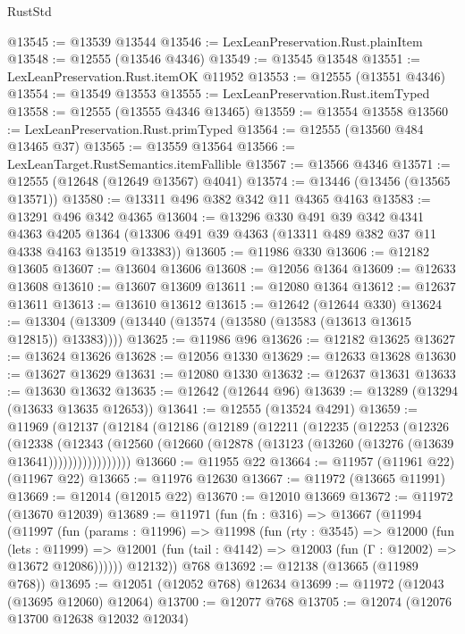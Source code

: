\begin{lexlean}{RustStd}
\begin{coremodule}
@13545 := @13539 @13544
@13546 := LexLeanPreservation.Rust.plainItem
@13548 := @12555 (@13546 @4346)
@13549 := @13545 @13548
@13551 := LexLeanPreservation.Rust.itemOK @11952
@13553 := @12555 (@13551 @4346)
@13554 := @13549 @13553
@13555 := LexLeanPreservation.Rust.itemTyped
@13558 := @12555 (@13555 @4346 @13465)
@13559 := @13554 @13558
@13560 := LexLeanPreservation.Rust.primTyped
@13564 := @12555 (@13560 @484 @13465 @37)
@13565 := @13559 @13564
@13566 := LexLeanTarget.RustSemantics.itemFallible
@13567 := @13566 @4346
@13571 := @12555 (@12648 (@12649 @13567) @4041)
@13574 := @13446 (@13456 (@13565 @13571))
@13580 := @13311 @496 @382 @342 @11 @4365 @4163
@13583 := @13291 @496 @342 @4365
@13604 := @13296
    @330
    @491
    @39
    @342
    @4341
    @4363
    @4205
    @1364
    (@13306 @491 @39 @4363 (@13311 @489 @382 @37 @11 @4338 @4163 @13519 @13383))
@13605 := @11986 @330
@13606 := @12182 @13605
@13607 := @13604 @13606
@13608 := @12056 @1364
@13609 := @12633 @13608
@13610 := @13607 @13609
@13611 := @12080 @1364
@13612 := @12637 @13611
@13613 := @13610 @13612
@13615 := @12642 (@12644 @330)
@13624 := @13304 (@13309 (@13440 (@13574 (@13580 (@13583 (@13613 @13615 @12815)) @13383))))
@13625 := @11986 @96
@13626 := @12182 @13625
@13627 := @13624 @13626
@13628 := @12056 @1330
@13629 := @12633 @13628
@13630 := @13627 @13629
@13631 := @12080 @1330
@13632 := @12637 @13631
@13633 := @13630 @13632
@13635 := @12642 (@12644 @96)
@13639 := @13289 (@13294 (@13633 @13635 @12653))
@13641 := @12555 (@13524 @4291)
@13659 := @11969
    (@12137
      (@12184
        (@12186
          (@12189
            (@12211
              (@12235
                (@12253
                  (@12326
                    (@12338
                      (@12343
                        (@12560
                          (@12660 (@12878 (@13123 (@13260 (@13276 (@13639 @13641)))))))))))))))))
@13660 := @11955 @22
@13664 := @11957 (@11961 @22) (@11967 @22)
@13665 := @11976 @12630
@13667 := @11972 (@13665 @11991)
@13669 := @12014 (@12015 @22)
@13670 := @12010 @13669
@13672 := @11972 (@13670 @12039)
@13689 := @11971
    (fun (fn : @316) =>
    @13667
      (@11994
        (@11997
          (fun (params : @11996) =>
          @11998
            (fun (rty : @3545) =>
            @12000
              (fun (lets : @11999) =>
              @12001 (fun (tail : @4142) => @12003 (fun (Γ : @12002) => @13672 @12086))))))
        @12132))
    @768
@13692 := @12138 (@13665 (@11989 @768))
@13695 := @12051 (@12052 @768) @12634
@13699 := @11972 (@12043 (@13695 @12060) @12064)
@13700 := @12077 @768
@13705 := @12074 (@12076 @13700 @12638 @12032 @12034)

\end{coremodule}
\end{lexlean}
